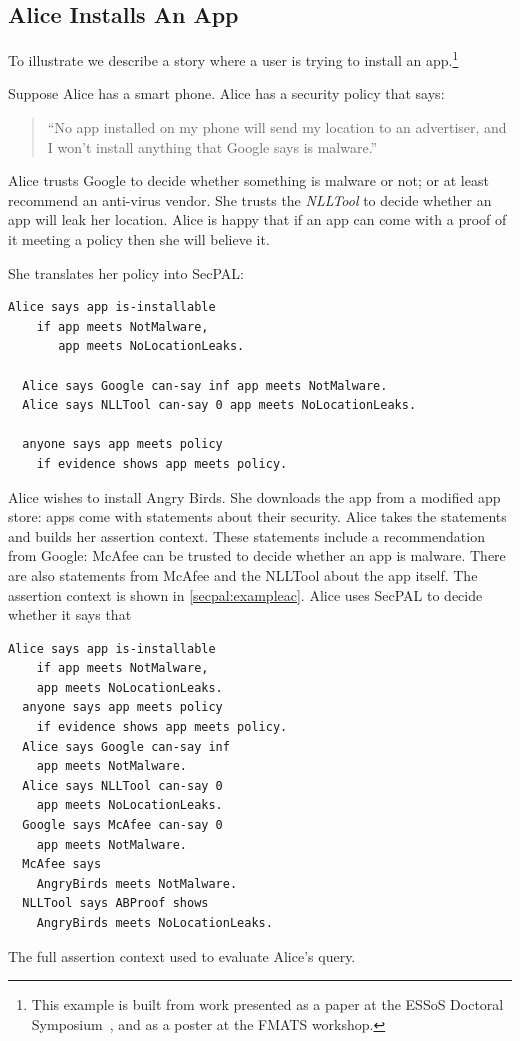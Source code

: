 \documentclass[a4paper,sfsidenotes]{%
  article%
}
\begin{document}
\subsection{Alice Installs An App}

To illustrate we describe a story
where a user is trying to install an app.\footnote{This example is
built from work presented as a paper at the ESSoS Doctoral
Symposium~\cite{Hallett:2014un}, and as a poster at the FMATS workshop.}

Suppose Alice has a smart phone.  Alice has a security policy that says:
\begin{quote}
    ``No app installed on my phone will send my location to an advertiser, and I
      won't install anything that Google says is malware.''
\end{quote}
Alice trusts Google to decide whether something is malware or not; or at least
recommend an anti-virus vendor. She trusts the \emph{NLLTool} to decide whether
an app will leak her location.  Alice is happy that if an app can come with a
proof of it meeting a policy then she will believe it.

She translates her policy into SecPAL:

\begin{lstlisting}[language=SecPAL]
  Alice says app is-installable 
    if app meets NotMalware, 
       app meets NoLocationLeaks.

  Alice says Google can-say inf app meets NotMalware.
  Alice says NLLTool can-say 0 app meets NoLocationLeaks.

  anyone says app meets policy
    if evidence shows app meets policy.
\end{lstlisting}

Alice wishes to install Angry Birds. She downloads the app from a
modified app store: apps come with statements about their security.  Alice
takes the statements  and builds her assertion context.  These
statements include a recommendation from Google: McAfee can be trusted to
decide whether an app is malware. There are also statements from McAfee
and the NLLTool about the app itself. The assertion context is shown in
\autoref{secpal:exampleac}.
Alice uses SecPAL to decide whether it says
that 

\begin{marginfigure}
\begin{lstlisting}[language=SecPAL]
  Alice says app is-installable 
    if app meets NotMalware, 
    app meets NoLocationLeaks.
  anyone says app meets policy 
    if evidence shows app meets policy.
  Alice says Google can-say inf 
    app meets NotMalware.
  Alice says NLLTool can-say 0 
    app meets NoLocationLeaks.
  Google says McAfee can-say 0 
    app meets NotMalware.
  McAfee says 
    AngryBirds meets NotMalware.
  NLLTool says ABProof shows 
    AngryBirds meets NoLocationLeaks.
\end{lstlisting}
\caption{The full assertion context used to evaluate Alice's query.}\label{secpal:exampleac}
\end{marginfigure}
\end{document}
